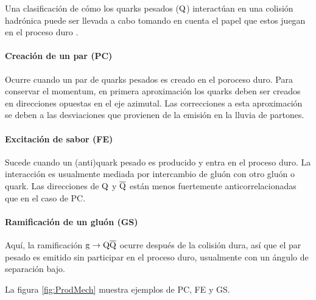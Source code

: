 Una clasificación de cómo los quarks pesados (${\mathrm Q}$) interactúan en una colisión hadrónica puede ser llevada a cabo tomando en cuenta el papel que estos juegan en el proceso duro \cite{Norrbin:2000zc}.

\paragraph{Creación de un par (PC)} Ocurre cuando un par de quarks pesados es creado en el poroceso duro. Para conservar el momentum, en primera aproximación los quarks deben ser creados en direcciones opuestas en el eje azimutal. Las correcciones a esta aproximación se deben a las desviaciones que provienen de la emisión en la lluvia de partones.

\paragraph{Excitación de sabor (FE)} Sucede cuando un (anti)quark pesado es producido y entra en el proceso duro. La interacción es usualmente mediada por intercambio de gluón con otro gluón o quark. Las direcciones de ${\mathrm Q}$ y $\overline{\mathrm Q}$ están menos fuertemente anticorrelacionadas que en el caso de PC.

\paragraph{Ramificación de un gluón (GS)} Aquí, la ramificación ${\mathrm g}\to{\mathrm Q}\overline{\mathrm Q}$ ocurre después de la colisión dura, así que el par pesado es emitido sin participar en el proceso duro, usualmente con un ángulo de separación bajo.

\vspace{1em}

La figura \ref{fig:ProdMech} muestra ejemplos de PC, FE y GS.

